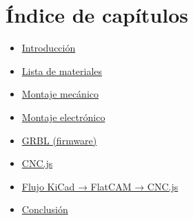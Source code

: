 \cleardoublepage
{}
\section*{Índice de capítulos}
\begin{itemize}
  \item \hyperref[ch:intro]{Introducción}
  \item \hyperref[ch:materials]{Lista de materiales}
  \item \hyperref[ch:mechanical]{Montaje mecánico}
  \item \hyperref[ch:electronic]{Montaje electrónico}
  \item \hyperref[ch:grbl]{GRBL (firmware)}
  \item \hyperref[ch:cncjs]{CNC.js}
  \item \hyperref[ch:workflow]{Flujo KiCad → FlatCAM → CNC.js}
  \item \hyperref[ch:conclusion]{Conclusión}
\end{itemize}

